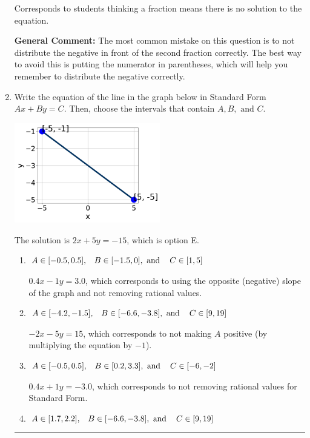 \documentclass{extbook}[14pt]
\newcommand{\litem}[1]{\item #1

\rule{\textwidth}{0.4pt}}
\begin{document}
\begin{enumerate}
{\begin{enumerate}[label=\Alph*.]
Corresponds to students thinking a fraction means there is no solution to the equation.
\end{enumerate}

\textbf{General Comment:} The most common mistake on this question is to not distribute the negative in front of the second fraction correctly. The best way to avoid this is putting the numerator in parentheses, which will help you remember to distribute the negative correctly.
}
\litem{
Write the equation of the line in the graph below in Standard Form $Ax+By=C$. Then, choose the intervals that contain $A, B, \text{ and } C$.

\begin{center}
    \includegraphics[width=0.5\textwidth]{../Figures/linearGraphToStandardC.png}
\end{center}


The solution is \( 2x + 5y = -15 \), which is option E.\begin{enumerate}[label=\Alph*.]
\item \( A \in [-0.5, 0.5], \hspace{3mm} B \in [-1.5, 0], \text{ and } \hspace{3mm} C \in [1, 5] \)

 $0.4x - 1y = 3.0$, which corresponds to using the opposite (negative) slope of the graph and not removing rational values.
\item \( A \in [-4.2, -1.5], \hspace{3mm} B \in [-6.6, -3.8], \text{ and } \hspace{3mm} C \in [9, 19] \)

 $-2x - 5y = 15$, which corresponds to not making $A$ positive (by multiplying the equation by $-1$).
\item \( A \in [-0.5, 0.5], \hspace{3mm} B \in [0.2, 3.3], \text{ and } \hspace{3mm} C \in [-6, -2] \)

 $0.4x + 1y = -3.0$, which corresponds to not removing rational values for Standard Form.
\item \( A \in [1.7, 2.2], \hspace{3mm} B \in [-6.6, -3.8], \text{ and } \hspace{3mm} C \in [9, 19] \)


\end{enumerate}}
\end{enumerate}
\end{document}
